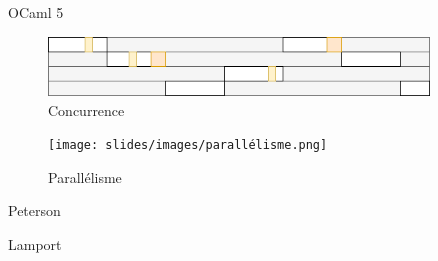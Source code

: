 
\begin{frame}{OCaml 5}


\begin{figure}
    \centering
    \includegraphics[width=0.9\textwidth]{slides/images/concurrence.png}
    \caption{Concurrence}
\end{figure}

\begin{figure}
    \centering
    \texttt{[image: slides/images/parallélisme.png]}
    \caption{Parallélisme}
\end{figure}
\end{frame}

\begin{frame}{Peterson}
    
\end{frame}

\begin{frame}{Lamport}
    
\end{frame}
